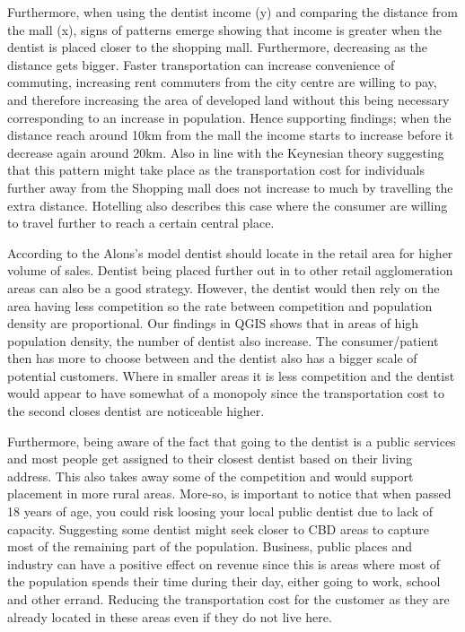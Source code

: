 \documentclass[
  10,
  a4paper,
]{article}
\begin{document}
Furthermore, when using the dentist income (y) and comparing the
distance from the mall (x), signs of patterns emerge showing that income
is greater when the dentist is placed closer to the shopping mall.
Furthermore, decreasing as the distance gets bigger. Faster
transportation can increase convenience of commuting, increasing rent
commuters from the city centre are willing to pay, and therefore
increasing the area of developed land without this being necessary
corresponding to an increase in population. Hence supporting findings;
when the distance reach around 10km from the mall the income starts to
increase before it decrease again around 20km. Also in line with the
Keynesian theory suggesting that this pattern might take place as the
transportation cost for individuals further away from the Shopping mall
does not increase to much by travelling the extra distance. Hotelling
also describes this case where the consumer are willing to travel
further to reach a certain central place.

According to the Alons's model dentist should locate in the retail area
for higher volume of sales. Dentist being placed further out in to other
retail agglomeration areas can also be a good strategy. However, the
dentist would then rely on the area having less competition so the rate
between competition and population density are proportional. Our
findings in QGIS shows that in areas of high population density, the
number of dentist also increase. The consumer/patient then has more to
choose between and the dentist also has a bigger scale of potential
customers. Where in smaller areas it is less competition and the dentist
would appear to have somewhat of a monopoly since the transportation
cost to the second closes dentist are noticeable higher.

Furthermore, being aware of the fact that going to the dentist is a
public services and most people get assigned to their closest dentist
based on their living address. This also takes away some of the
competition and would support placement in more rural areas. More-so, is
important to notice that when passed 18 years of age, you could risk
loosing your local public dentist due to lack of capacity. Suggesting
some dentist might seek closer to CBD areas to capture most of the
remaining part of the population. Business, public places and industry
can have a positive effect on revenue since this is areas where most of
the population spends their time during their day, either going to work,
school and other errand. Reducing the transportation cost for the
customer as they are already located in these areas even if they do not
live here.
\end{document}
